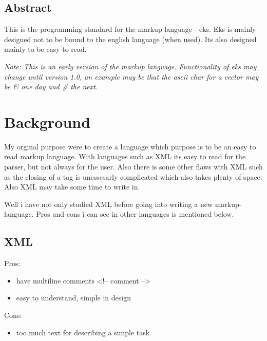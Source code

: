 \documentclass{book}
\begin{document}
	\section*{Abstract}
	
	This is the programming standard for the markup language - eks. 
	Eks is mainly designed not to be bound to the english language (when used). Its also designed mainly to be easy to read.
	
	\emph{Note: This is an early version of the markup language. Functionality of eks may change until version 1.0, an example may be that the ascii char for a vector may be \& one day and \# the next.}
	
	\newpage
	
	\tableofcontents
	\newpage
	
	
	\chapter{Background}
	
	My orginal purpose were to create a language which purpose is to be an easy to read markup language. 
	With languages such as XML its easy to read for the parser, but not always for the user. 
	Also there is some other flaws with XML such as the closing of a tag is unessesarly complicated which also takes plenty of space.
	Also XML may take some time to write in. 
	
	Well i have not only studied XML before going into writing a new markup-language.
	Pros and cons i can see in other languages is mentioned below.

	\section{XML}
	
	Pros:
	
	\begin{itemize}
		\item have multiline comments <!-- comment -->
		\item easy to understand, simple in design
	\end{itemize}
	
	Cons:
	
	\begin{itemize}
		\item too much text for describing a simple task.
	\end{itemize}
	
\end{document}
